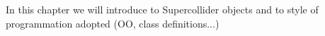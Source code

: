 \documentclass[main.tex]{subfiles}
\begin{document}
In this chapter we will introduce to Supercollider objects and to style of programmation adopted (OO, class definitions...)\\
\end{document}
